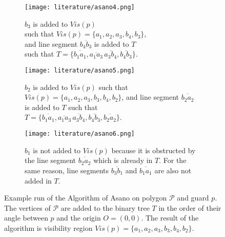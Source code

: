 \begin{figure}[h!]
	\ContinuedFloat
	\centering
	\begin{subfigure}{0.45\linewidth}
		\texttt{[image: literature/asano4.png]}
		\caption{$b_3$ is added to $Vis(p)$ \\ such that $Vis(p)=\{a_1, a_2, a_3, b_4, b_3\}$, \\ and line segment $\overline{b_4b_3}$ is added to $T$ \\ such that $T = \{\overline{b_1a_1}, \overline{a_1a_3}\, \overline{a_3b_4}, \overline{b_4b_3}\}$.}
	\end{subfigure}
	\begin{subfigure}{0.45\linewidth}
		\texttt{[image: literature/asano5.png]}
		\caption{$b_2$ is added to $Vis(p)$ such that \\ $Vis(p) = \{a_1, a_2, a_3, b_3, b_4, b_2\}$, and line segment $\overline{b_2a_2}$ is added to $T$ such that \\ $T = \{\overline{b_1a_1}, \overline{a_1a_3}\, \overline{a_3b_4}, \overline{b_4b_3}, \overline{b_2a_2}\}$.}
	\end{subfigure}

	\begin{subfigure}{\linewidth}
		\centering
		\texttt{[image: literature/asano6.png]}
		\caption{$b_1$ is not added to $Vis(p)$ because it is obstructed by the line segment $\overline{b_2a_2}$ which is already in $T$. For the same reason, line segments $\overline{b_3b_1}$ and $\overline{b_1a_1}$ are also not added in $T$.}
		\label{fig:asano7}
	\end{subfigure}
	\caption{Example run of the Algorithm of Asano \cite{asano1985efficient} on polygon $\mathcal P$ and guard $p$. The vertices of $\mathcal P$ are added to the binary tree $T$ in the order of their angle between $p$ and the origin $O = (0, 0)$. The result of the algorithm is visibility region $Vis(p) = \{a_1, a_2, a_3, b_3, b_4, b_2\}$.}
	\label{fig:asano}
\end{figure}



\newpage 
